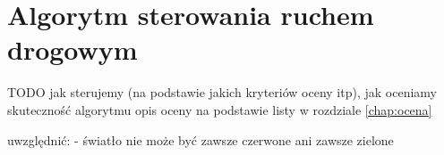 \chapter{Algorytm sterowania ruchem drogowym}
TODO jak sterujemy (na podstawie jakich kryteriów oceny itp), jak oceniamy skuteczność algorytmu
opis oceny na podstawie listy w rozdziale \ref{chap:ocena}

uwzględnić: - światło nie może być zawsze czerwone ani zawsze zielone